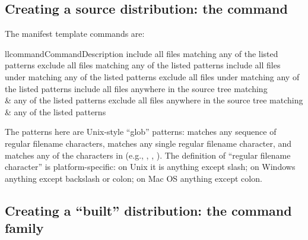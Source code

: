 \documentclass{howto}
\begin{document}
\subsection{Creating a source distribution: the \protect{} command}
\label{sdist-cmd}



The manifest template commands are:
\begin{tableii}{ll}{command}{Command}{Description}
    {include all files matching any of the listed patterns}
    {exclude all files matching any of the listed patterns}
    {include all files under  matching any of the listed patterns}
    {exclude all files under  matching any of the listed patterns}
    {include all files anywhere in the source tree matching\\&
     any of the listed patterns}
    {exclude all files anywhere in the source tree matching\\&
     any of the listed patterns}
\end{tableii}
The patterns here are Unix-style ``glob'' patterns: \code{*} matches any
sequence of regular filename characters,  matches any single
regular filename character, and  matches any of the
characters in  (e.g., , ,
).  The definition of ``regular filename character'' is
platform-specific: on Unix it is anything except slash; on Windows
anything except backslash or colon; on Mac OS anything except colon.



\subsection{Creating a ``built'' distribution: the
  \protect{} command family}
\label{bdist-cmds}


\subsubsection{\protect{}}

\subsubsection{\protect{}}

\subsubsection{\protect{}}

\subsubsection{\protect{}}
\end{document}
